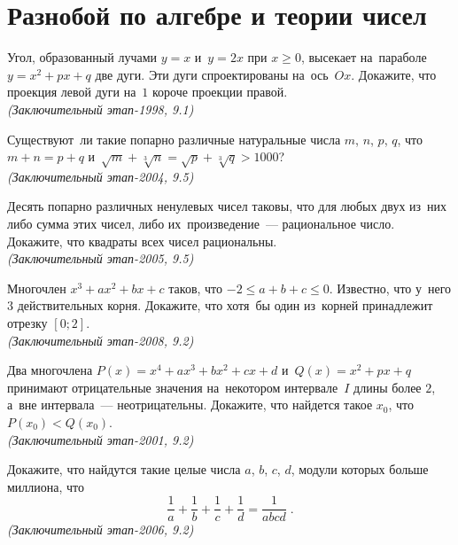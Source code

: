 
\section*{Разнобой по алгебре и теории чисел}


\begin{problems}

\item
Угол, образованный лучами $y = x$ и~$y = 2 x$ при $x \geq 0$, высекает
на~параболе $y = x^2 + px + q$ две дуги.
Эти дуги спроектированы на~ось~$Ox$.
Докажите, что проекция левой дуги на~$1$ короче проекции правой.
\\\emph{(Заключительный этап-1998, 9.1)}

\item
Существуют~ли такие попарно различные натуральные числа $m$, $n$, $p$, $q$, что
$m + n = p + q$ и~$\sqrt{m} + \sqrt[3]{n} = \sqrt{p} + \sqrt[3]{q} > 1000$?
\\\emph{(Заключительный этап-2004, 9.5)}

\item
Десять попарно различных ненулевых чисел таковы, что для любых двух из~них либо
сумма этих чисел, либо их~произведение~--- рациональное число.
Докажите, что квадраты всех чисел рациональны.
\\\emph{(Заключительный этап-2005, 9.5)}

\item
Многочлен $x^3 + a x^2 + b x + c$ таков, что $-2 \leq a + b + c \leq 0$.
Известно, что у~него $3$ действительных корня.
Докажите, что хотя~бы один из~корней принадлежит отрезку $[0; 2]$.
\\\emph{(Заключительный этап-2008, 9.2)}

\item
Два многочлена $P(x) = x^4 + a x^3 + b x^2 + c x + d$ и~$Q(x) = x^2 + p x + q$
принимают отрицательные значения на~некотором интервале~$I$ длины более $2$,
а~вне интервала~--- неотрицательны.
Докажите, что найдется такое $x_0$, что $P(x_0) < Q(x_0)$.
\\\emph{(Заключительный этап-2001, 9.2)}

\item
Докажите, что найдутся такие целые числа $a$, $b$, $c$, $d$, модули которых
больше миллиона, что
\[
    \frac{1}{a} + \frac{1}{b} + \frac{1}{c} + \frac{1}{d}
=
    \frac{1}{a b c d}
\;.\]
\emph{(Заключительный этап-2006, 9.2)}


\end{problems}
